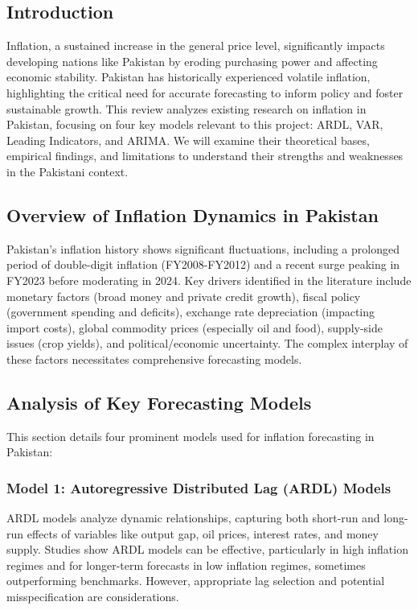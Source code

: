 \documentclass[12pt,a4paper]{article}
\begin{document}
\subsection{Introduction}
Inflation, a sustained increase in the general price level, significantly impacts developing nations like Pakistan by eroding purchasing power and affecting economic stability. Pakistan has historically experienced volatile inflation, highlighting the critical need for accurate forecasting to inform policy and foster sustainable growth. This review analyzes existing research on inflation in Pakistan, focusing on four key models relevant to this project: ARDL, VAR, Leading Indicators, and ARIMA. We will examine their theoretical bases, empirical findings, and limitations to understand their strengths and weaknesses in the Pakistani context.

\subsection{Overview of Inflation Dynamics in Pakistan}
Pakistan's inflation history shows significant fluctuations, including a prolonged period of double-digit inflation (FY2008-FY2012) and a recent surge peaking in FY2023 before moderating in 2024. Key drivers identified in the literature include monetary factors (broad money and private credit growth), fiscal policy (government spending and deficits), exchange rate depreciation (impacting import costs), global commodity prices (especially oil and food), supply-side issues (crop yields), and political/economic uncertainty. The complex interplay of these factors necessitates comprehensive forecasting models.

\subsection{Analysis of Key Forecasting Models}
This section details four prominent models used for inflation forecasting in Pakistan:

\subsubsection{Model 1: Autoregressive Distributed Lag (ARDL) Models}
ARDL models analyze dynamic relationships, capturing both short-run and long-run effects of variables like output gap, oil prices, interest rates, and money supply. Studies show ARDL models can be effective, particularly in high inflation regimes and for longer-term forecasts in low inflation regimes, sometimes outperforming benchmarks. However, appropriate lag selection and potential misspecification are considerations.
\end{document}
